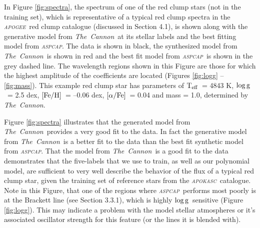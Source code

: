 \documentclass[12pt, preprint]{aastex}
\newcommand{\project}[1]{\textsl{#1}}
\newcommand{\tc}{\project{The~Cannon}}
\newcommand{\apogee}{\project{\textsc{apogee}}}
\newcommand{\apokasc}{\project{\textsc{apokasc}}}
\newcommand{\aspcap}{\project{\textsc{aspcap}}}
\newcommand{\teff}{\mbox{$\rm T_{eff}$}}
\newcommand{\feh}{\mbox{$\rm [Fe/H]$}}
\newcommand{\alphafe}{\mbox{$\rm [\alpha/Fe]$}}
\newcommand{\logg}{\mbox{$\rm \log g$}}
\begin{document}
In Figure \ref{fig:spectra}, the spectrum of one of the red clump stars (not in the training set), which is representative of a typical red clump spectra in the \apogee\ red clump catalogue (discussed in Section 4.1), is shown along with the generative model from \tc\ at its stellar labels and the best fitting model from \aspcap. The data is shown in black, the synthesized model from \tc\ is shown in red and the best fit model from \aspcap\ is shown in the grey dashed line. The wavelength regions shown in this Figure are those for which the highest amplitude of the coefficients are located (Figures \ref{fig:logg} -- \ref{fig:mass}).  This example red clump star has parameters of \teff\ = 4843 K, \logg\ = 2.5 dex, \feh\ = --0.06 dex, \alphafe\ = 0.04 and mass = 1.0, determined by \tc. 


Figure \ref{fig:spectra} illustrates that the generated model from \tc\ provides a very good fit to the data. In fact the generative model from \tc\ is a better fit to the data than the best fit synthetic model from \aspcap. That the model from \tc\ is a good fit to the data demonstrates that the five-labels that we use to train, as well as our polynomial model, are sufficient to very well describe the behavior of the flux of a typical red clump star, given the training set of reference stars from the \apokasc\ catalogue. Note in this Figure, that one of the regions where \aspcap\ performs most poorly is at the Brackett line (see Section 3.3.1), which is highly \logg\ sensitive (Figure \ref{fig:logg}). This may indicate a problem with the model stellar atmospheres or it's associated oscillator strength for this feature (or the lines it is blended with). 
\end{document}
